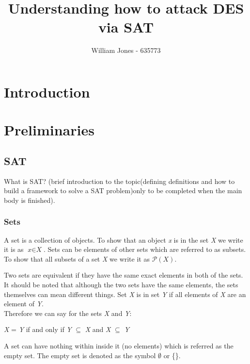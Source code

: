 \documentclass[11pt,a4paper]{report}
\author{William Jones - 635773}
\begin{document}
\title{Understanding how to attack DES via SAT}
\maketitle
\tableofcontents

\chapter{Introduction}
\label{cha:Introduction}


\chapter{Preliminaries}
\label{cha:prelim}

\section{SAT}
\label{sec:SAT}

What is SAT? (brief introduction to the topic(defining definitions and how to build a framework to solve a SAT problem)only to be completed when the main body is finished).


\subsection{Sets}
A set is a collection of objects. To show that an object \textit{x} is in the set \textit{X} we write it is as $\textit{x} \in \textit{X}$. Sets can be elements of other sets which are referred to as subsets. To show that all subsets of a set \textit{X} we write it as $\mathcal{P}(\textit{X})$. 


\noindent Two sets are equivalent if they have the same exact elements in both of the sets. It should be noted that although the two sets have the same elements, the sets themselves can mean different things. Set \textit{X} is in set \textit{Y} if all elements of \textit{X} are an element of \textit{Y}.\\
Therefore we can say for the sets \textit{X} and \textit{Y}:

\begin{center}
{\textit{X} = \textit{Y} if and only if \textit{Y} $\subseteq$ \textit{X} and \textit{X} $\subseteq$ \textit{Y}}
\end{center}

\noindent A set can have nothing within inside it (no elements) which is referred as the empty set. The empty set is denoted as the symbol $\emptyset$ or \{\}.
\end{document}
